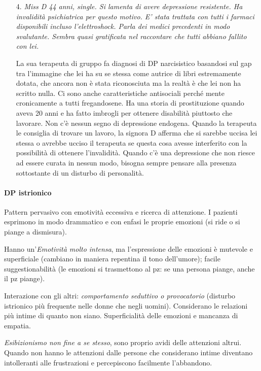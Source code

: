 \begin{itemize}
\item[4.]
  \emph{Miss D 44 anni, single. Si lamenta di avere depressione
  resistente. Ha invalidità psichiatrica per questo motivo. E' stata
  trattata con tutti i farmaci disponibili incluso l'elettroshock. Parla
  dei medici precedenti in modo svalutante. Sembra quasi gratificata nel
  raccontare che tutti abbiano fallito con lei. }

La sua terapeuta di gruppo fa diagnosi di DP narcisistico basandosi sul
gap tra l'immagine che lei ha su se stessa come autrice di libri
estremamente dotata, che ancora non è stata riconosciuta ma la realtà è
che lei non ha scritto nulla. Ci sono anche caratteristiche antisociali
perché mente cronicamente a tutti fregandosene. Ha una storia di
prostituzione quando aveva 20 anni e ha fatto imbrogli per ottenere
disabilità piuttosto che lavorare. Non c'è nessun segno di depressione
endogena. Quando la terapeuta le consiglia di trovare un lavoro, la
signora D afferma che si sarebbe uccisa lei stessa o avrebbe ucciso il
terapeuta se questa cosa avesse interferito con la possibilità di
ottenere l'invalidità. Quando c'è una depressione che non riesce ad
essere curata in nessun modo, bisogna sempre pensare alla presenza
sottostante di un disturbo di personalità.
\end{itemize}

\paragraph{DP istrionico}

Pattern pervasivo con emotività eccessiva e ricerca di attenzione. I
pazienti esprimono in modo drammatico e con enfasi le proprie emozioni
(si ride o si piange a dismisura).

Hanno un'\emph{Emotività molto intensa}, ma l'espressione delle emozioni
è mutevole e superficiale (cambiano in maniera repentina il tono
dell'umore); facile suggestionabilità (le emozioni si trasmettono al pz:
se una persona piange, anche il pz piange).

Interazione con gli altri: \emph{comportamento seduttivo o provocatorio}
(disturbo istrionico più frequente nelle donne che negli uomini).
Considerano le relazioni più intime di quanto non siano. Superficialità
delle emozioni e mancanza di empatia.

\emph{Esibizionismo non fine a se stesso}, sono proprio avidi delle
attenzioni altrui. Quando non hanno le attenzioni dalle persone che
considerano intime diventano intolleranti alle frustrazioni e
percepiscono facilmente l'abbandono.

